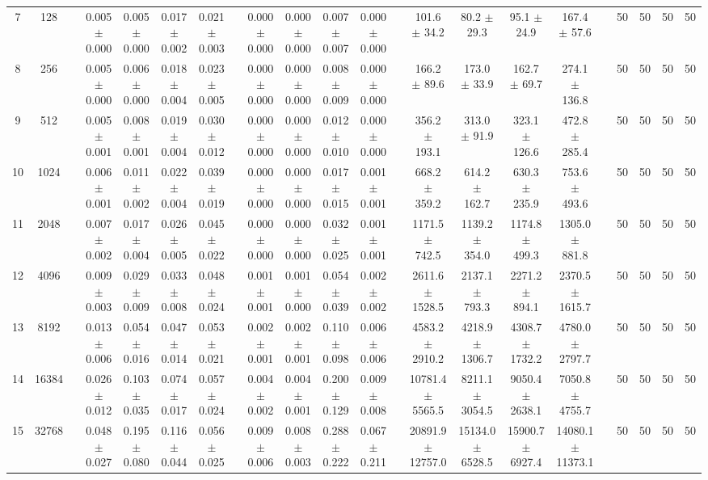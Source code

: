 \documentclass[11pt]{article}
\begin{document}
\begin{landscape}
\begin{table}
\begin{tabular}{cccccccccccccccccccccc}
 7 &     128 &&  0.005 $\pm$ 0.000 & 0.005 $\pm$ 0.000 & 0.017 $\pm$ 0.002 & 0.021 $\pm$ 0.003 &&  0.000 $\pm$ 0.000 & 0.000 $\pm$ 0.000 & 0.007 $\pm$ 0.007 & 0.000 $\pm$ 0.000 &&  101.6 $\pm$ 34.2 & 80.2 $\pm$ 29.3 & 95.1 $\pm$ 24.9 & 167.4 $\pm$ 57.6 && 50& 50& 50& 50\\
 8 &     256 &&  0.005 $\pm$ 0.000 & 0.006 $\pm$ 0.000 & 0.018 $\pm$ 0.004 & 0.023 $\pm$ 0.005 &&  0.000 $\pm$ 0.000 & 0.000 $\pm$ 0.000 & 0.008 $\pm$ 0.009 & 0.000 $\pm$ 0.000 &&  166.2 $\pm$ 89.6 & 173.0 $\pm$ 33.9 & 162.7 $\pm$ 69.7 & 274.1 $\pm$ 136.8 && 50& 50& 50& 50\\
 9 &     512 &&  0.005 $\pm$ 0.001 & 0.008 $\pm$ 0.001 & 0.019 $\pm$ 0.004 & 0.030 $\pm$ 0.012 &&  0.000 $\pm$ 0.000 & 0.000 $\pm$ 0.000 & 0.012 $\pm$ 0.010 & 0.000 $\pm$ 0.000 &&  356.2 $\pm$ 193.1 & 313.0 $\pm$ 91.9 & 323.1 $\pm$ 126.6 & 472.8 $\pm$ 285.4 && 50& 50& 50& 50\\
10 &    1024 &&  0.006 $\pm$ 0.001 & 0.011 $\pm$ 0.002 & 0.022 $\pm$ 0.004 & 0.039 $\pm$ 0.019 &&  0.000 $\pm$ 0.000 & 0.000 $\pm$ 0.000 & 0.017 $\pm$ 0.015 & 0.001 $\pm$ 0.001 &&  668.2 $\pm$ 359.2 & 614.2 $\pm$ 162.7 & 630.3 $\pm$ 235.9 & 753.6 $\pm$ 493.6 && 50& 50& 50& 50\\
11 &    2048 &&  0.007 $\pm$ 0.002 & 0.017 $\pm$ 0.004 & 0.026 $\pm$ 0.005 & 0.045 $\pm$ 0.022 &&  0.000 $\pm$ 0.000 & 0.000 $\pm$ 0.000 & 0.032 $\pm$ 0.025 & 0.001 $\pm$ 0.001 &&  1171.5 $\pm$ 742.5 & 1139.2 $\pm$ 354.0 & 1174.8 $\pm$ 499.3 & 1305.0 $\pm$ 881.8 && 50& 50& 50& 50\\
12 &    4096 &&  0.009 $\pm$ 0.003 & 0.029 $\pm$ 0.009 & 0.033 $\pm$ 0.008 & 0.048 $\pm$ 0.024 &&  0.001 $\pm$ 0.001 & 0.001 $\pm$ 0.000 & 0.054 $\pm$ 0.039 & 0.002 $\pm$ 0.002 &&  2611.6 $\pm$ 1528.5 & 2137.1 $\pm$ 793.3 & 2271.2 $\pm$ 894.1 & 2370.5 $\pm$ 1615.7 && 50& 50& 50& 50\\
13 &    8192 &&  0.013 $\pm$ 0.006 & 0.054 $\pm$ 0.016 & 0.047 $\pm$ 0.014 & 0.053 $\pm$ 0.021 &&  0.002 $\pm$ 0.001 & 0.002 $\pm$ 0.001 & 0.110 $\pm$ 0.098 & 0.006 $\pm$ 0.006 &&  4583.2 $\pm$ 2910.2 & 4218.9 $\pm$ 1306.7 & 4308.7 $\pm$ 1732.2 & 4780.0 $\pm$ 2797.7 && 50& 50& 50& 50\\
14 &   16384 &&  0.026 $\pm$ 0.012 & 0.103 $\pm$ 0.035 & 0.074 $\pm$ 0.017 & 0.057 $\pm$ 0.024 &&  0.004 $\pm$ 0.002 & 0.004 $\pm$ 0.001 & 0.200 $\pm$ 0.129 & 0.009 $\pm$ 0.008 &&  10781.4 $\pm$ 5565.5 & 8211.1 $\pm$ 3054.5 & 9050.4 $\pm$ 2638.1 & 7050.8 $\pm$ 4755.7 && 50& 50& 50& 50\\
15 &   32768 &&  0.048 $\pm$ 0.027 & 0.195 $\pm$ 0.080 & 0.116 $\pm$ 0.044 & 0.056 $\pm$ 0.025 &&  0.009 $\pm$ 0.006 & 0.008 $\pm$ 0.003 & 0.288 $\pm$ 0.222 & 0.067 $\pm$ 0.211 &&  20891.9 $\pm$ 12757.0 & 15134.0 $\pm$ 6528.5 & 15900.7 $\pm$ 6927.4 & 14080.1 $\pm$ 11373.1 && 50& 50& 50& 50\\

\end{tabular}
\end{table}
\end{landscape}
\end{document}
